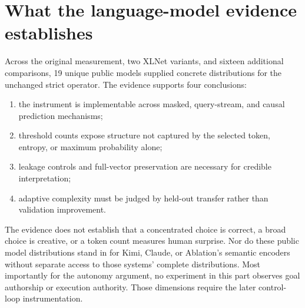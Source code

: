\section{What the language-model evidence establishes}
Across the original measurement, two XLNet variants, and sixteen additional comparisons, 19 unique public models supplied concrete distributions for the unchanged strict operator. The evidence supports four conclusions:
\begin{enumerate}
  \item the instrument is implementable across masked, query-stream, and causal prediction mechanisms;
  \item threshold counts expose structure not captured by the selected token, entropy, or maximum probability alone;
  \item leakage controls and full-vector preservation are necessary for credible interpretation;
  \item adaptive complexity must be judged by held-out transfer rather than validation improvement.
\end{enumerate}
The evidence does not establish that a concentrated choice is correct, a broad choice is creative, or a token count measures human surprise. Nor do these public model distributions stand in for Kimi, Claude, or Ablation's semantic encoders without separate access to those systems' complete distributions. Most importantly for the autonomy argument, no experiment in this part observes goal authorship or execution authority. Those dimensions require the later control-loop instrumentation.

